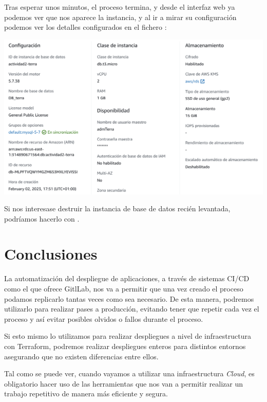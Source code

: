 \documentclass{\ClassPath/viu-tfm-template}
\begin{document}
Tras esperar unos minutos, el proceso termina, y desde el interfaz web ya podemos ver que nos aparece la instancia, y al ir a mirar su configuración podemos ver los detalles configurados en el fichero :

\vspace{-10pt}
\begin{center}
    \includegraphics[frame,width=\linewidth]{img/terraform2.png}
\end{center}
\vspace{-20pt}

Si nos interesase destruir la instancia de base de datos recién levantada, podríamos hacerlo con .

\chapter{Conclusiones}

La automatización del despliegue de aplicaciones, a través de sistemas CI/CD como el que ofrece GitlLab, nos va a permitir que una vez creado el proceso podamos replicarlo tantas veces como sea necesario. De esta manera, podremos utilizarlo para realizar pases a producción, evitando tener que repetir cada vez el proceso y así evitar posibles olvidos o fallos durante el proceso.

Si esto mismo lo utilizamos para realizar despliegues a nivel de infraestructura con Terraform, podremos realizar despliegues enteros para distintos entornos asegurando que no existen diferencias entre ellos.

Tal como se puede ver, cuando vayamos a utilizar una infraestructura \textit{Cloud}, es obligatorio hacer uso de las herramientas que nos van a permitir realizar un trabajo repetitivo de manera más eficiente y segura.
\end{document}
